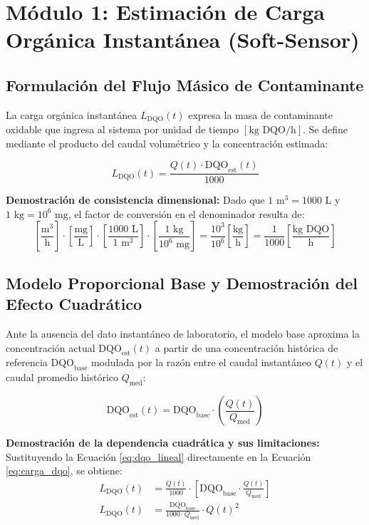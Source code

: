 \documentclass[11pt, a4paper]{article}
\begin{document}
\section{Módulo 1: Estimación de Carga Orgánica Instantánea (Soft-Sensor)}

\subsection{Formulación del Flujo Másico de Contaminante}
La carga orgánica instantánea $L_{\text{DQO}}(t)$ expresa la masa de contaminante oxidable que ingresa al sistema por unidad de tiempo $\left[\text{kg DQO/h}\right]$. Se define mediante el producto del caudal volumétrico y la concentración estimada:

\begin{equation}
    L_{\text{DQO}}(t) = \frac{Q(t) \cdot \text{DQO}_{\text{est}}(t)}{1000}
    \label{eq:carga_dqo}
\end{equation}

\textbf{Demostración de consistencia dimensional:}
Dado que $1\text{ m}^3 = 1000\text{ L}$ y $1\text{ kg} = 10^6\text{ mg}$, el factor de conversión en el denominador resulta de:
\begin{equation*}
    \left[\frac{\text{m}^3}{\text{h}}\right] \cdot \left[\frac{\text{mg}}{\text{L}}\right] \cdot \left[\frac{1000\text{ L}}{1\text{ m}^3}\right] \cdot \left[\frac{1\text{ kg}}{10^6\text{ mg}}\right] = \frac{10^3}{10^6} \left[\frac{\text{kg}}{\text{h}}\right] = \frac{1}{1000} \left[\frac{\text{kg DQO}}{\text{h}}\right]
\end{equation*}

\subsection{Modelo Proporcional Base y Demostración del Efecto Cuadrático}
Ante la ausencia del dato instantáneo de laboratorio, el modelo base aproxima la concentración actual $\text{DQO}_{\text{est}}(t)$ a partir de una concentración histórica de referencia $\text{DQO}_{\text{base}}$ modulada por la razón entre el caudal instantáneo $Q(t)$ y el caudal promedio histórico $Q_{\text{med}}$:

\begin{equation}
    \text{DQO}_{\text{est}}(t) = \text{DQO}_{\text{base}} \cdot \left(\frac{Q(t)}{Q_{\text{med}}}\right)
    \label{eq:dqo_lineal}
\end{equation}

\textbf{Demostración de la dependencia cuadrática y sus limitaciones:}
Sustituyendo la Ecuación \eqref{eq:dqo_lineal} directamente en la Ecuación \eqref{eq:carga_dqo}, se obtiene:
\begin{align}
    L_{\text{DQO}}(t) &= \frac{Q(t)}{1000} \cdot \left[ \text{DQO}_{\text{base}} \cdot \frac{Q(t)}{Q_{\text{med}}} \right] \nonumber \\
    L_{\text{DQO}}(t) &= \frac{\text{DQO}_{\text{base}}}{1000 \cdot Q_{\text{med}}} \cdot Q(t)^2
    \label{eq:carga_cuadratica}
\end{align}
\end{document}
